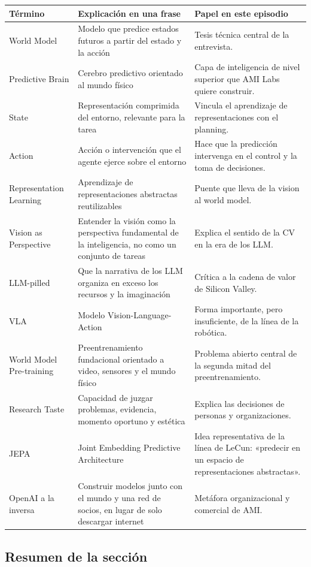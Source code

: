 \documentclass[a4paper]{article}
\begin{document}
\begin{longtable}{p{}p{}p{}}
\toprule
Término & Explicación en una frase & Papel en este episodio \\
\midrule
World Model & Modelo que predice estados futuros a partir del estado y la acción & Tesis técnica central de la entrevista. \\
Predictive Brain & Cerebro predictivo orientado al mundo físico & Capa de inteligencia de nivel superior que AMI Labs quiere construir. \\
State & Representación comprimida del entorno, relevante para la tarea & Vincula el aprendizaje de representaciones con el planning. \\
Action & Acción o intervención que el agente ejerce sobre el entorno & Hace que la predicción intervenga en el control y la toma de decisiones. \\
Representation Learning & Aprendizaje de representaciones abstractas reutilizables & Puente que lleva de la vision al world model. \\
Vision as Perspective & Entender la visión como la perspectiva fundamental de la inteligencia, no como un conjunto de tareas & Explica el sentido de la CV en la era de los LLM. \\
LLM-pilled & Que la narrativa de los LLM organiza en exceso los recursos y la imaginación & Crítica a la cadena de valor de Silicon Valley. \\
VLA & Modelo Vision-Language-Action & Forma importante, pero insuficiente, de la línea de la robótica. \\
World Model Pre-training & Preentrenamiento fundacional orientado a video, sensores y el mundo físico & Problema abierto central de la segunda mitad del preentrenamiento. \\
Research Taste & Capacidad de juzgar problemas, evidencia, momento oportuno y estética & Explica las decisiones de personas y organizaciones. \\
JEPA & Joint Embedding Predictive Architecture & Idea representativa de la línea de LeCun: «predecir en un espacio de representaciones abstractas». \\
OpenAI a la inversa & Construir modelos junto con el mundo y una red de socios, en lugar de solo descargar internet & Metáfora organizacional y comercial de AMI. \\
\bottomrule
\end{longtable}

\subsection{Resumen de la sección}
\end{document}
